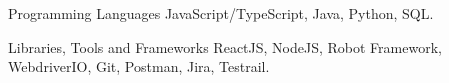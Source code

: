 

\begin{cvskills}

  \cvskill
    {Programming Languages} %
    {JavaScript/TypeScript, Java, Python, SQL.} %

  \cvskill
    {Libraries, Tools and Frameworks} %
    {ReactJS, NodeJS, Robot Framework, WebdriverIO, Git, Postman, Jira, Testrail.} %

\end{cvskills}
